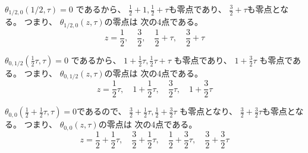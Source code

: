 \documentclass[12pt,b5paper]{ltjsarticle}
\begin{document}
\begin{description}
\begin{description}
$\theta_{1/2,0}(1/2,\tau)=0$
であるから、
$\frac{1}{2}+1,\frac{1}{2}+\tau$も零点であり、
$\frac{3}{2}+\tau$も零点となる。
つまり、
$\theta_{1/2,0}(z,\tau)$の零点は
次の4点である。
\begin{equation}
 z=\frac{1}{2},\quad
  \frac{3}{2},\quad
  \frac{1}{2}+\tau,\quad
  \frac{3}{2}+\tau
\end{equation}



$\theta_{0,1/2}(\frac{1}{2}\tau,\tau)=0$
であるから、
$1+\frac{1}{2}\tau,\frac{1}{2}\tau+\tau$
も零点であり、
$1+\frac{3}{2}\tau$
も零点である。
つまり、
$\theta_{0,1/2}(z,\tau)$の零点は
次の4点である。
\begin{equation}
 z=\frac{1}{2}\tau,\quad
  1+\frac{1}{2}\tau,\quad
  \frac{3}{2}\tau,\quad
  1+\frac{3}{2}\tau
\end{equation}


$\theta_{0,0}(\frac{1}{2}+\frac{1}{2}\tau,\tau)=0$であるので、
$\frac{3}{2}+\frac{1}{2}\tau,\frac{1}{2}+\frac{3}{2}\tau$
も零点となり、
$\frac{3}{2}+\frac{3}{2}\tau$も零点となる。
つまり、
$\theta_{0,0}(z,\tau)$の零点は
次の4点である。
\begin{equation}
 z=\frac{1}{2}+\frac{1}{2}\tau,\quad
  \frac{3}{2}+\frac{1}{2}\tau,\quad
  \frac{1}{2}+\frac{3}{2}\tau,\quad
  \frac{3}{2}+\frac{3}{2}\tau
\end{equation}


\hrulefill

\end{description}

\end{description}

\hrulefill
\end{document}
